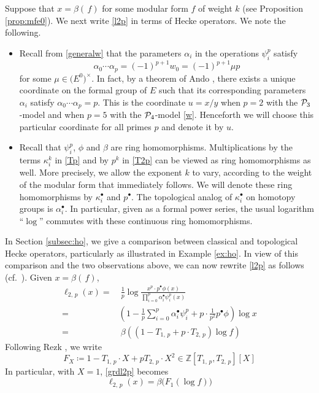 \documentclass{gtpart}
\theoremstyle{definition}
\theoremstyle{remark}
\newcommand{\mb}[1]{\mathbb{#1}}
\newcommand{\CP}{{\cal P}}
\newcommand{\BZ}{{\mb Z}}
\newcommand{\A}{\alpha}
\newcommand{\B}{\beta}
\newcommand{\K}{\kappa}
\newcommand{\ce}{\coloneqq}
\renewcommand{\=}{\approx}
\renewcommand{\-}{\sim}
\numberwithin{equation}{section}
\begin{document}
Suppose that $x = \B(\,f)$ for some modular form $f$ of weight $k$ (see 
Proposition \ref{prop:mfe0}).  We next write \eqref{l2p} in terms of Hecke 
operators.  We note the following.  
\begin{itemize}
 \item Recall from \eqref{generalw} that the parameters $\A_i$ in the operations 
 $\psi^p_i$ satisfy 
 \[
  \A_0 \cdots \A_p = (-1)^{p+1} w_0 = (-1)^{p+1} \mu p 
 \]
 for some $\mu \in \big( E^0 \big)^{\!\times}$.  In fact, by a theorem of Ando 
 \cite[Theorem 4]{Ando95}, there exists a unique coordinate on the formal group 
 of $E$ such that its corresponding parameters $\A_i$ satisfy 
 $\A_0 \cdots \A_p = p$.  This is the coordinate $u = x/y$ when $p = 2$ with the 
 $\CP_3$-model \cite[Section 3]{h2p2} and when $p = 5$ with the $\CP_4$-model 
 \eqref{w}.  Henceforth we will choose this particular coordinate for all primes 
 $p$ and denote it by $u$.  

 \item Recall that $\psi^p_i$, $\phi$ and $\B$ are ring homomorphisms.  
 Multiplications by the terms $\K_i^k$ in \eqref{Tp} and by $p^k$ in \eqref{T2p} 
 can be viewed as ring homomorphisms as well.  More precisely, we allow the 
 exponent $k$ to vary, according to the weight of the modular form that 
 immediately follows.  We will denote these ring homomorphisms by $\K_i^\bullet$ 
 and $p^\bullet$.  The topological analog of $\K_i^\bullet$ on homotopy groups 
 is $\A_i^\bullet$.  In particular, given as a formal power series, the usual 
 logarithm ``$\log$'' commutes with these continuous ring homomorphisms.  
\end{itemize}
In Section \ref{subsec:ho}, we give a comparison between classical and 
topological Hecke operators, particularly as illustrated in Example \ref{ex:ho}.  
In view of this comparison and the two observations above, we can now rewrite 
\eqref{l2p} as follows (cf.~\cite[1.12]{log}).  Given $x = \B(\,f)$, 
\begin{equation}
 \label{grdl2p}
 \begin{split}
  \ell_{2,\,p}(x) = & ~ \frac{1}{p} \log \frac{x^p \cdot p^\bullet 
                      \phi(x)}{\prod_{i=0}^p \A_i^\bullet \psi^p_i(x)} \\
                  = & \left( 1 - \frac{1}{p} \sum_{i = 0}^p \A_i^\bullet 
                      \psi^p_i + p \cdot \frac{1}{p^2} p^\bullet \phi \right) 
                      \log x \\
                  = & ~ \B \left( (1 - T_{1,\,p} + p \cdot T_{2,\,p}) 
                      \log f \right) 
 \end{split}
\end{equation}
Following Rezk \cite[1.12]{log}, we write 
\begin{equation}
 \label{FX}
 F_X \ce 1 - T_{1,\,p} \cdot X + p T_{2,\,p} \cdot X^2 \in 
 \BZ[T_{1,\,p},T_{2,\,p}][X] 
\end{equation}
In particular, with $X = 1$, \eqref{grdl2p} becomes 
\begin{equation}
 \label{F1}
 \ell_{2,\,p}(x) = \B \big( F_1 (\log f) \big) 
\end{equation}
\end{document}
